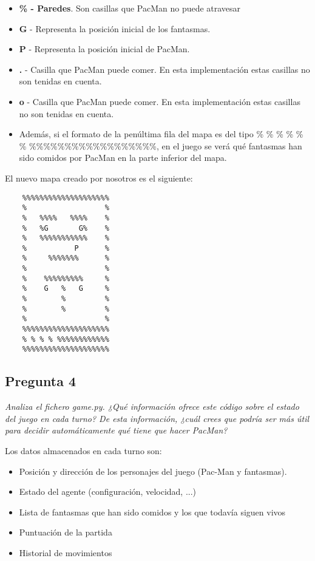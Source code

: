 \documentclass[12pt]{article}
\begin{document}
\begin{itemize}
    \item \textbf{\% - Paredes}. Son casillas que PacMan no puede atravesar
    \item \textbf{G} - Representa la posición inicial de los fantasmas.
    \item \textbf{P} - Representa la posición inicial de PacMan.
    \item \textbf{.} - Casilla que PacMan puede comer. En esta implementación
    estas casillas no son tenidas en cuenta.
    \item \textbf{o} - Casilla que PacMan puede comer. En esta implementación
    estas casillas no son tenidas en cuenta.
    \item Además, si el formato de la penúltima fila del mapa es del tipo \% \%
    \% \% \% \% \%\%\%\%\%\%\%\%\%\%\%\%\%\%\%\%\%\%, en el juego se verá qué
    fantasmas han sido comidos por PacMan en la parte inferior del mapa.
\end{itemize}

El nuevo mapa creado por nosotros es el siguiente:
\begin{verbatim}
    %%%%%%%%%%%%%%%%%%%%
    %                  %
    %   %%%%   %%%%    %
    %   %G       G%    %
    %   %%%%%%%%%%%    %
    %           P      %
    %     %%%%%%%      %
    %                  %
    %    %%%%%%%%%     %
    %    G   %   G     %
    %        %         %
    %        %         %
    %                  %
    %%%%%%%%%%%%%%%%%%%%
    % % % % %%%%%%%%%%%%
    %%%%%%%%%%%%%%%%%%%%
\end{verbatim}


\newpage
\begin{center}
\subsection{Pregunta 4}

\emph{Analiza el fichero game.py. ¿Qué información ofrece este código sobre el
estado del juego en cada turno? De esta información, ¿cuál crees que podría
ser más útil para decidir automáticamente qué tiene que hacer PacMan?}
\end{center}

Los datos almacenados en cada turno son:

\begin{itemize}
    \item Posición y dirección de los personajes del juego (Pac-Man y fantasmas).
    \item Estado del agente (configuración, velocidad, ...)
    \item Lista de fantasmas que han sido comidos y los que todavía siguen vivos
    \item Puntuación de la partida
    \item Historial de movimientos
\end{itemize}
\end{document}

